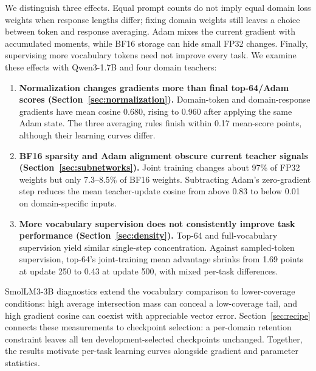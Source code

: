 We distinguish three effects. Equal prompt counts do not imply equal domain loss weights when response lengths differ; fixing domain weights still leaves a choice between token and response averaging. Adam mixes the current gradient with accumulated moments, while BF16 storage can hide small FP32 changes. Finally, supervising more vocabulary tokens need not improve every task. We examine these effects with Qwen3-1.7B and four domain teachers:
\begin{enumerate}
\item \textbf{Normalization changes gradients more than final top-64/Adam scores (Section~\ref{sec:normalization}).}
Domain-token and domain-response gradients have mean cosine 0.680, rising to 0.960 after applying the same Adam state. The three averaging rules finish within 0.17 mean-score points, although their learning curves differ.
\item \textbf{BF16 sparsity and Adam alignment obscure current teacher signals (Section~\ref{sec:subnetworks}).}
Joint training changes about 97\% of FP32 weights but only 7.3--8.5\% of BF16 weights. Subtracting Adam's zero-gradient step reduces the mean teacher-update cosine from above 0.83 to below 0.01 on domain-specific inputs.
\item \textbf{More vocabulary supervision does not consistently improve task performance (Section~\ref{sec:density}).}
Top-64 and full-vocabulary supervision yield similar single-step concentration. Against sampled-token supervision, top-64's joint-training mean advantage shrinks from 1.69 points at update 250 to 0.43 at update 500, with mixed per-task differences.
\end{enumerate}

SmolLM3-3B diagnostics extend the vocabulary comparison to lower-coverage conditions: high average intersection mass can conceal a low-coverage tail, and high gradient cosine can coexist with appreciable vector error. Section~\ref{sec:recipe} connects these measurements to checkpoint selection: a per-domain retention constraint leaves all ten development-selected checkpoints unchanged. Together, the results motivate per-task learning curves alongside gradient and parameter statistics.
